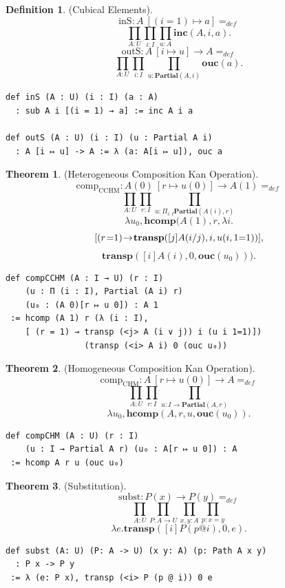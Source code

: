 \documentclass{article}
\theoremstyle{definition}
\newtheorem{definition}{Definition}
\newtheorem{theorem}{Theorem}
\begin{document}
\begin{definition} (Cubical Elements).
$$
  \mathrm{inS} :  A\ [(i=1) \mapsto a ] =_{def}
$$
$$
  \prod_{A:U}\prod_{i:I}\prod_{a:A}\mathbf{inc}(A,i,a).
$$
$$
  \mathrm{outS} : A\ [i \mapsto u] \rightarrow A =_{def}
$$
$$
  \prod_{A:U}\prod_{i:I}\prod_{u:\mathbf{Partial}(A,i)}
  \mathbf{ouc}(a).
$$
\begin{lstlisting}[mathescape=true]
def inS (A : U) (i : I) (a : A)
  : sub A i [(i = 1) → a] := inc A i a

def outS (A : U) (i : I) (u : Partial A i)
  : A [i ↦ u] -> A := λ (a: A[i ↦ u]), ouc a
\end{lstlisting}
\end{definition}

\begin{theorem} (Heterogeneous Composition Kan Operation).
$$
  \mathrm{comp}_{\mathrm{CCHM}} : A(0)\ [r \mapsto u(0)] \rightarrow A(1) =_{def}
$$
$$
  \prod_{A:U}\prod_{r:I} \prod_{u: \Pi_{i:I}\mathbf{Partial}(A(i),r)}
$$
$$
  \lambda u_0, \mathbf{hcomp}(A(1),r,\lambda i.
$$
$$
  [(r\hspace{0.1em}\mbox{=}1)\hspace{-0.2em}\rightarrow\hspace{-0.2em}\mathbf{transp}([j]A(i /\\ j),i,u(i,1\hspace{0em}\mbox{=}1)) ],
$$
$$
  \mathbf{transp}([i]A(i),0,\mathbf{ouc}(u_0))).
$$
\begin{lstlisting}[mathescape=true]
def compCCHM (A : I → U) (r : I)
    (u : Π (i : I), Partial (A i) r)
    (u₀ : (A 0)[r ↦ u 0]) : A 1
 := hcomp (A 1) r (λ (i : I),
    [ (r = 1) → transp (<j> A (i ∨ j)) i (u i 1=1)])
                (transp (<i> A i) 0 (ouc u₀))
\end{lstlisting}
\end{theorem}

\begin{theorem} (Homogeneous Composition Kan Operation).
$$
  \mathrm{comp}_{\mathrm{CHM}} : A\ [r \mapsto u(0)] \rightarrow A =_{def}
$$
$$
  \prod_{A:U}\prod_{r:I} \prod_{u:I\rightarrow \mathbf{Partial}(A,r)}
$$
$$
  \lambda u_0, \mathbf{hcomp}(A,r,u,\mathbf{ouc}(u_0)).
$$
\begin{lstlisting}[mathescape=true]
def compCHM (A : U) (r : I)
    (u : I → Partial A r) (u₀ : A[r ↦ u 0]) : A
 := hcomp A r u (ouc u₀)
\end{lstlisting}
\end{theorem}

\begin{theorem} (Substitution).
$$
  \mathrm{subst} : P(x) \rightarrow P(y) =_{def}
$$
$$
  \prod_{A:U}\prod_{P:A\rightarrow U}\prod_{x,y:A}\prod_{p:x=y}
$$
$$
  \lambda e.\mathbf{transp}([i] P (p @ i),0,e).
$$
\begin{lstlisting}[mathescape=true]
def subst (A: U) (P: A -> U) (x y: A) (p: Path A x y)
  : P x -> P y
 := λ (e: P x), transp (<i> P (p @ i)) 0 e
\end{lstlisting}
\end{theorem}
\end{document}
